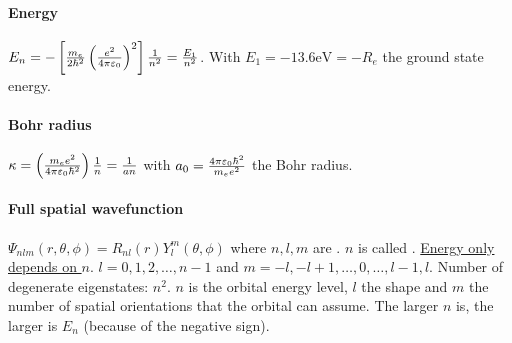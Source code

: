 \paragraph{Energy}
$E_n = - \left[ \frac{m_e}{2 \hbar^2} \left( \frac{e^2}{4 \pi \varepsilon_0} \right)^2 \right] \frac{1}{n^2}
= \frac{E_1}{n^2}$. With $E_1 = -13.6 \mathrm{eV} = - R_e$ the ground state energy.

\paragraph{Bohr radius}
$\kappa = \left( \frac{m_e e^2}{4 \pi \varepsilon_0 \hbar^2} \right) \frac{1}{n} = \frac{1}{a n}$
with $a_0 = \frac{4 \pi \varepsilon_0 \hbar^2}{m_e e^2}$ the Bohr radius.

\paragraph{Full spatial wavefunction}
$\Psi_{nlm} (r,\theta,\phi) = R_{nl}(r) Y_l^m (\theta,\phi)$
where $n,l,m$ are . $n$ is called .
\underline{Energy only depends on $n$}. $l = 0,1,2,\dots,n-1$ and $m = -l,-l+1,\dots,
0,\dots,l-1,l$. Number of degenerate eigenstates: $n^2$.
$n$ is the orbital energy level, $l$ the shape and $m$ the number of spatial orientations
that the orbital can assume. The larger $n$ is, the larger is $E_n$ (because of
the negative sign).



